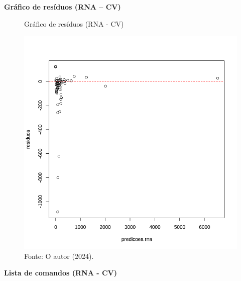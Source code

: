 \begin{center}
    \textbf{Gráfico de resíduos (RNA – CV)}
\end{center}


\begin{figure}[H]
\centering
\caption{Gráfico de resíduos (RNA - CV)}
\includegraphics[width=.8\linewidth]{apendices/fig/8_IAA008_16.png}
\caption*{Fonte: O autor (2024).}
\end{figure}



\begin{center}
    \textbf{Lista de comandos (RNA - CV)}
\end{center}



